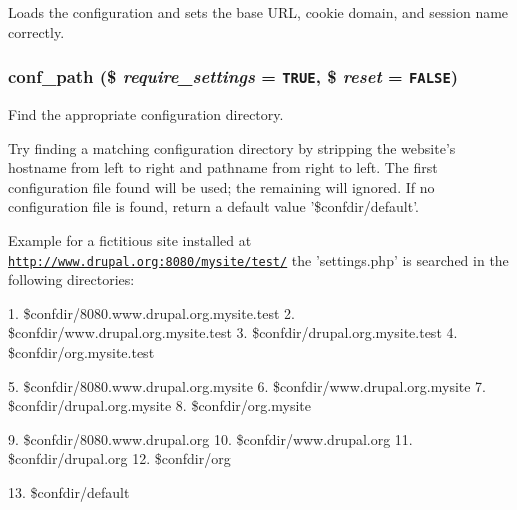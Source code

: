Loads the configuration and sets the base URL, cookie domain, and session name correctly. \hypertarget{bootstrap_8inc_cef612ef19c49f6259531f0bee5c26cc}{
\subsubsection[{conf\_\-path}]{\setlength{\rightskip}{0pt plus 5cm}conf\_\-path (\$ {\em require\_\-settings} = {\tt TRUE}, \/  \$ {\em reset} = {\tt FALSE})}}
\label{bootstrap_8inc_cef612ef19c49f6259531f0bee5c26cc}


Find the appropriate configuration directory.

Try finding a matching configuration directory by stripping the website's hostname from left to right and pathname from right to left. The first configuration file found will be used; the remaining will ignored. If no configuration file is found, return a default value '\$confdir/default'.

Example for a fictitious site installed at \href{http://www.drupal.org:8080/mysite/test/}{\tt http://www.drupal.org:8080/mysite/test/} the 'settings.php' is searched in the following directories:

1. \$confdir/8080.www.drupal.org.mysite.test 2. \$confdir/www.drupal.org.mysite.test 3. \$confdir/drupal.org.mysite.test 4. \$confdir/org.mysite.test

5. \$confdir/8080.www.drupal.org.mysite 6. \$confdir/www.drupal.org.mysite 7. \$confdir/drupal.org.mysite 8. \$confdir/org.mysite

9. \$confdir/8080.www.drupal.org 10. \$confdir/www.drupal.org 11. \$confdir/drupal.org 12. \$confdir/org

13. \$confdir/default

